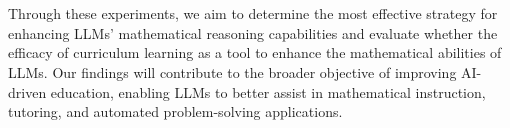 \\\\
Through these experiments, we aim to determine the most effective strategy for enhancing LLMs’ mathematical reasoning capabilities and evaluate whether the efficacy of curriculum learning as a tool to enhance the mathematical abilities of LLMs. Our findings will contribute to the broader objective of improving AI-driven education, enabling LLMs to better assist in mathematical instruction, tutoring, and automated problem-solving applications. 



